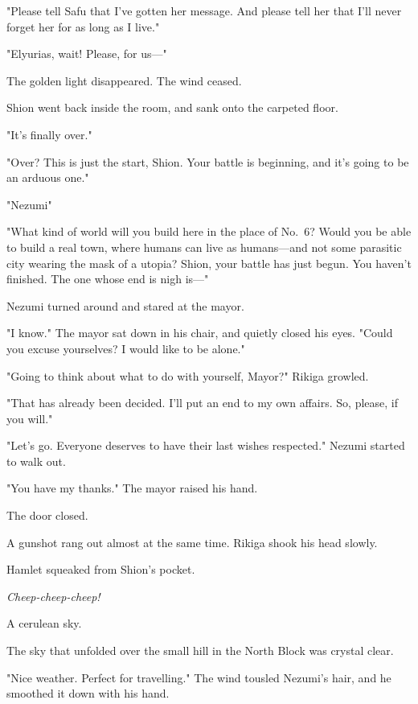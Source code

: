 "Please tell Safu that I've gotten her message. And please tell her that
I'll never forget her for as long as I live."


"Elyurias, wait! Please, for us---"


The golden light disappeared. The wind ceased.

\mybreak

Shion went back inside the room, and sank onto the carpeted floor.

"It's finally over."

"Over? This is just the start, Shion. Your battle is beginning, and it's
going to be an arduous one."

"Nezumi\el "

"What kind of world will you build here in the place of No.~6? Would you
be able to build a real town, where humans can live as humans---and not
some parasitic city wearing the mask of a utopia? Shion, your battle has
just begun. You haven't finished. The one whose end is nigh is---"

Nezumi turned around and stared at the mayor.

"I know." The mayor sat down in his chair, and quietly closed his eyes.
"Could you excuse yourselves? I would like to be alone."

"Going to think about what to do with yourself, Mayor?" Rikiga growled.

"That has already been decided. I'll put an end to my own affairs. So,
please, if you will."

"Let's go. Everyone deserves to have their last wishes respected."
Nezumi started to walk out.

"You have my thanks." The mayor raised his hand.

The door closed.

A gunshot rang out almost at the same time. Rikiga shook his head
slowly.

Hamlet squeaked from Shion's pocket.

\emph{Cheep-cheep-cheep!}

\mybreak

A cerulean sky.

The sky that unfolded over the small hill in the North Block was crystal
clear.

"Nice weather. Perfect for travelling." The wind tousled Nezumi's hair,
and he smoothed it down with his hand.

